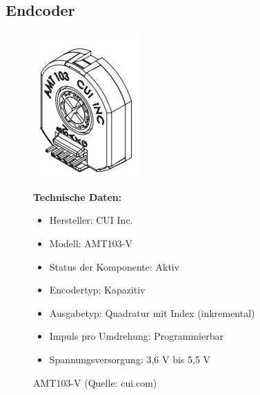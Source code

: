 \subsection{Endcoder}
\begin{figure}[htb]
	\centering
	\begin{minipage}{0.38\linewidth}
		\centering
		\includegraphics[scale=0.9]{images/Entcoder.jpg}
		\caption{AMT103-V  \newline (Quelle: cui.com)}
		\label{Endcoder}
	\end{minipage}
	\begin{minipage}[h]{0.6\textwidth}
		\textbf{Technische Daten:} 
		\begin{itemize} 
			\item Hersteller: CUI Inc.
			\item Modell:	AMT103-V
			\item Status der Komponente:	Aktiv
			\item Encodertyp:	Kapazitiv
			\item Ausgabetyp: Quadratur mit Index (inkremental)
			\item Impuls pro Umdrehung: Programmierbar
			\item Spannungsversorgung:	3,6 V bis 5,5 V
		\end{itemize}
	\end{minipage}
\end{figure}

